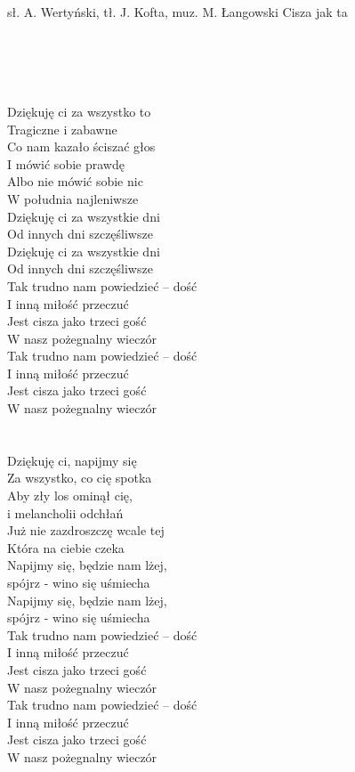 {sł. A. Wertyński, tł. J. Kofta, muz. M. Łangowski}
{Cisza jak ta}
\begin{text}
\vin \\
\vin \\
\vin \\
\vin \\
Dziękuję ci za wszystko to \\
Tragiczne i zabawne \\
Co nam kazało ściszać głos \\
I mówić sobie prawdę \\
Albo nie mówić sobie nic \\
W południa najleniwsze \\
Dziękuję ci za wszystkie dni \\
Od innych dni szczęśliwsze \\
Dziękuję ci za wszystkie dni \\
Od innych dni szczęśliwsze \\

\vin Tak trudno nam powiedzieć – dość \\
\vin I inną miłość przeczuć \\
\vin Jest cisza jako trzeci gość \\
\vin W nasz pożegnalny wieczór \\
\vin Tak trudno nam powiedzieć – dość \\
\vin I inną miłość przeczuć \\
\vin Jest cisza jako trzeci gość \\
\vin W nasz pożegnalny wieczór \\
\vin \\
\vin \\

Dziękuję ci, napijmy się \\
Za wszystko, co cię spotka \\
Aby zły los ominął cię, \\
i melancholii odchłań \\
Już nie zazdroszczę wcale tej \\
Która na ciebie czeka \\
Napijmy się, będzie nam lżej, \\
spójrz - wino się uśmiecha \\
Napijmy się, będzie nam lżej, \\
spójrz - wino się uśmiecha \\

\vin Tak trudno nam powiedzieć – dość \\
\vin I inną miłość przeczuć \\
\vin Jest cisza jako trzeci gość \\
\vin W nasz pożegnalny wieczór \\
\vin Tak trudno nam powiedzieć – dość \\
\vin I inną miłość przeczuć \\
\vin Jest cisza jako trzeci gość \\
\vin W nasz pożegnalny wieczór \\
\vin \\
\vin \\
\vin \\
\vin \\


\end{text}
